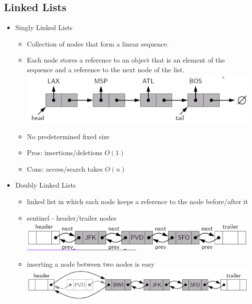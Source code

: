 \documentclass{article}
\begin{document}
\begin{multicols*}{3}
    \section{Linked Lists}
    \renewcommand\labelitemi{{\boldmath$\cdot$}}
    \begin{itemize}[noitemsep]
        \item Singly Linked Lists
        \begin{itemize}
            \item Collection of nodes that form a linear sequence.
            \item Each node stores a reference to an object that is 
            an element of the sequence and a reference to the next node of the list.
            \includegraphics[width=\linewidth]{singly_linked_list}                
            \item No predetermined fixed size
            \item Pros: insertions/deletions $O(1)$
            \item Cons: access/search takes $O(n)$
        \end{itemize}
        \item Doubly Linked Lists 
        \begin{itemize}
            \item linked list in which each node keeps a reference
            to the node before/after it
            \item sentinel - header/trailer nodes
            \includegraphics[width=\linewidth]{doubly_linked_list}
            \item inserting a node between two nodes is easy
            \includegraphics[width=\linewidth]{doubly_linked_list_insertion}
        \end{itemize}
    \end{itemize}



\end{multicols*}
\end{document}
